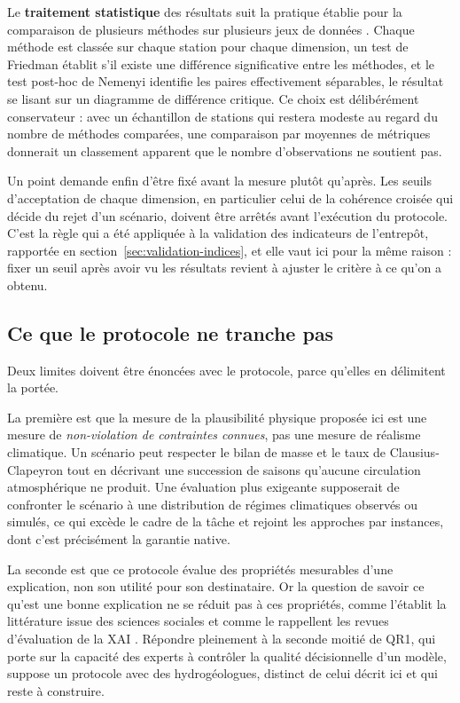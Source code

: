 Le \textbf{traitement statistique} des résultats suit la pratique établie pour la comparaison de plusieurs méthodes sur plusieurs jeux de données \cite{demsar2006statistical}. Chaque méthode est classée sur chaque station pour chaque dimension, un test de Friedman établit s'il existe une différence significative entre les méthodes, et le test post-hoc de Nemenyi \cite{nemenyi1963distribution} identifie les paires effectivement séparables, le résultat se lisant sur un diagramme de différence critique. Ce choix est délibérément conservateur : avec un échantillon de stations qui restera modeste au regard du nombre de méthodes comparées, une comparaison par moyennes de métriques donnerait un classement apparent que le nombre d'observations ne soutient pas.

Un point demande enfin d'être fixé avant la mesure plutôt qu'après. Les seuils d'acceptation de chaque dimension, en particulier celui de la cohérence croisée qui décide du rejet d'un scénario, doivent être arrêtés avant l'exécution du protocole. C'est la règle qui a été appliquée à la validation des indicateurs de l'entrepôt, rapportée en section~\ref{sec:validation-indices}, et elle vaut ici pour la même raison : fixer un seuil après avoir vu les résultats revient à ajuster le critère à ce qu'on a obtenu.

\subsection{Ce que le protocole ne tranche pas}

Deux limites doivent être énoncées avec le protocole, parce qu'elles en délimitent la portée.

La première est que la mesure de la plausibilité physique proposée ici est une mesure de \emph{non-violation de contraintes connues}, pas une mesure de réalisme climatique. Un scénario peut respecter le bilan de masse et le taux de Clausius-Clapeyron tout en décrivant une succession de saisons qu'aucune circulation atmosphérique ne produit. Une évaluation plus exigeante supposerait de confronter le scénario à une distribution de régimes climatiques observés ou simulés, ce qui excède le cadre de la tâche et rejoint les approches par instances, dont c'est précisément la garantie native.

La seconde est que ce protocole évalue des propriétés mesurables d'une explication, non son utilité pour son destinataire. Or la question de savoir ce qu'est une bonne explication ne se réduit pas à ces propriétés, comme l'établit la littérature issue des sciences sociales \cite{miller2019explanation} et comme le rappellent les revues d'évaluation de la XAI \cite{nauta2023anecdotal}. Répondre pleinement à la seconde moitié de QR1, qui porte sur la capacité des experts à contrôler la qualité décisionnelle d'un modèle, suppose un protocole avec des hydrogéologues, distinct de celui décrit ici et qui reste à construire.
